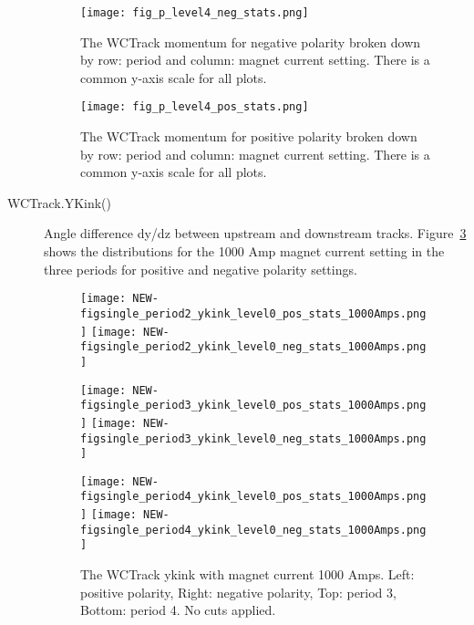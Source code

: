 \begin{description}
{}


 
 
 
 
 \begin{figure}
 \texttt{[image: fig\_p\_level4\_neg\_stats.png]}
 \caption[short]{The WCTrack momentum for negative polarity broken down by row: period and column: magnet current setting. There is a common y-axis scale for all plots.}
 \label{fig:p12_neg}
  \end{figure}
 
 
  \begin{figure}
 \texttt{[image: fig\_p\_level4\_pos\_stats.png]}
 \caption[short]{The WCTrack momentum for positive polarity broken down by row: period and column: magnet current setting. There is a common y-axis scale for all plots.}
 \label{fig:p12_pos}
  \end{figure}
  
  
  
  \item[WCTrack.YKink()] {  Angle difference dy/dz  between upstream and downstream tracks. Figure~\ref{fig_ykink} shows the  distributions for the 1000 Amp magnet current setting in the three periods for positive and negative polarity settings.
    \begin{figure}[h]
    
       	\texttt{[image: NEW-figsingle\_period2\_ykink\_level0\_pos\_stats\_1000Amps.png]}
	 \texttt{[image: NEW-figsingle\_period2\_ykink\_level0\_neg\_stats\_1000Amps.png]}
	 
   	\texttt{[image: NEW-figsingle\_period3\_ykink\_level0\_pos\_stats\_1000Amps.png]}
	 \texttt{[image: NEW-figsingle\_period3\_ykink\_level0\_neg\_stats\_1000Amps.png]}
	 
 	\texttt{[image: NEW-figsingle\_period4\_ykink\_level0\_pos\_stats\_1000Amps.png]}
	 \texttt{[image: NEW-figsingle\_period4\_ykink\_level0\_neg\_stats\_1000Amps.png]}
   \caption[short]{The WCTrack ykink with magnet current 1000 Amps. Left: positive polarity, Right: negative polarity, Top: period 3, Bottom: period 4. No cuts applied.}
   \label{fig_ykink}
  \end{figure}
  }
  

\end{description}
